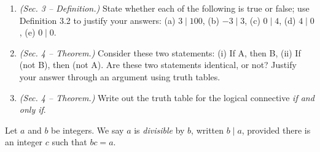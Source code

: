 \documentclass[10pt]{beamer}
\begin{document}
\begin{frame}

 \begin{myredbox}[title=Weekly Quiz \#1]  
\begin{enumerate}
	\item  \textit{(Sec. 3 -- Definition.)}  State whether each of the following is true or false; use Definition 3.2 to justify your answers: (a) $3 \mid 100$, (b) $-3 \mid 3$, (c) $0 \mid 4$, (d) $4 \mid 0$, (e) $0 \mid 0$.
	\item \textit{(Sec. 4 -- Theorem.)} Consider these two statements: (i) If A, then B, (ii) If (not B), then (not A).  Are these two statements identical, or not? Justify your answer through an argument using truth tables.
	\item \textit{(Sec. 4 -- Theorem.)}  Write out the truth table for the logical connective \textit{if and only if}. 
\end{enumerate}
\end{myredbox}

\vfill 
\begin{mygreenbox}[title=Reference Material: Scheinerman Definition 3.2] Let $a$ and $b$ be integers.  We say $a$ is \textit{divisible} by $b$, written $b \mid a$, provided there is an integer $c$ such that $bc=a$. 	
\end{mygreenbox}

\end{frame}



%
%
%
%
%
\end{document}
